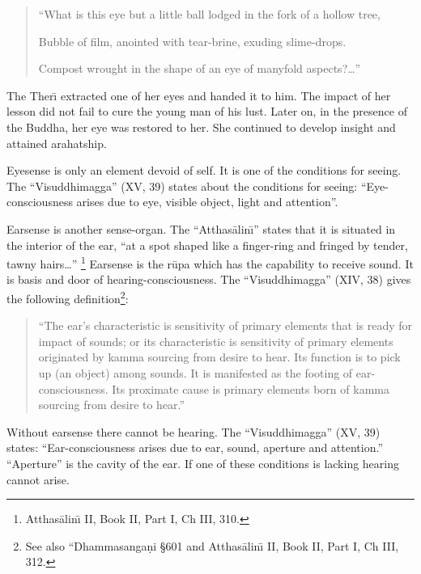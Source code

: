 \documentclass{book}
\begin{document}
\begin{verse}
``What is this eye but a little ball lodged in the fork of a hollow 
tree,

Bubble of film, anointed with tear-brine, exuding slime-drops.

Compost wrought in the shape of an eye of manyfold aspects?\ldots''
\end{verse}




The Ther\=\i{}  extracted one of her eyes and handed it to him. The impact
of her lesson did not fail to cure the young man of his lust. Later on,
in the presence of the Buddha, her eye was restored to her. She
continued to develop insight and attained arahatship.

Eyesense is only an element devoid of self. It is one of the conditions
for seeing. The ``Visuddhimagga'' (XV, 39) states about the conditions
for seeing: ``Eye-consciousness arises due to eye, visible object,
light and attention''. 

Earsense is another sense-organ. The ``Atthas{\=a}lin\=\i'' states that
it is situated in the interior of the ear, ``at a spot shaped like a
finger-ring and fringed by tender, tawny hairs\ldots''
\footnote{Atthas{\=a}lin\=\i{}  II, Book II, Part I, Ch III, 310.}
Earsense is the r\=upa which has the capability to receive sound. It is
basis and door of hearing-consciousness. The ``Visuddhimagga'' (XIV,
38) gives the following definition\footnote{See also
``Dhamma\-sanga\d ni {\S}601 and Atthas{\=a}lin\=\i{}  II, Book II, Part I,
Ch III, 312.}: 




\begin{quote}\begin{flushleft}
``The ear's characteristic is sensitivity of primary elements that is
ready for impact of sounds; or its characteristic is sensitivity of
primary elements originated by kamma sourcing from desire to hear. Its
function is to pick up (an object) among sounds. It is manifested as
the footing of ear-consciousness. Its proximate cause is primary
elements born of kamma sourcing from desire to hear.''
\end{flushleft}\end{quote}




Without earsense there cannot be hearing. The ``Visuddhimagga'' (XV,
39) states: ``Ear-consciousness arises due to ear, sound, aperture
and attention.'' ``Aperture'' is the cavity of the ear. If one of these
conditions is lacking hearing cannot arise. 
\end{document}
